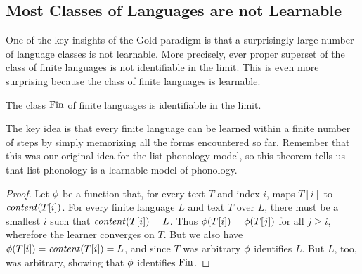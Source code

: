 \subsection{Most Classes of Languages are not Learnable}

One of the key insights of the Gold paradigm is that a surprisingly large number of language classes is not learnable.
More precisely, ever proper superset of the class of finite languages is not identifiable in the limit.
This is even more surprising because the class of finite languages is learnable.
%
\begin{theorem}
    The class $\mathrm{Fin}$ of finite languages is identifiable in the limit.
\end{theorem}
%
The key idea is that every finite language can be learned within a finite number of steps by simply memorizing all the forms encountered so far.
Remember that this was our original idea for the list phonology model, so this theorem tells us that list phonology is a learnable model of phonology.
%
\begin{proof}
    Let $\phi$ be a function that, for every text $T$ and index $i$, maps $T[i]$ to $\mathit{content}(T[i])$.
    For every finite language $L$ and text $T$ over $L$, there must be a smallest $i$ such that $\mathit{content}(T[i]) = L$.
    Thus $\phi(T[i]) = \phi(T[j])$ for all $j \geq i$, wherefore the learner converges on $T$.
    But we also have $\phi(T[i]) = \mathit{content}(T[i]) = L$, and since $T$ was arbitrary $\phi$ identifies $L$.
    But $L$, too, was arbitrary, showing that $\phi$ identifies $\mathrm{Fin}$.
\end{proof}


